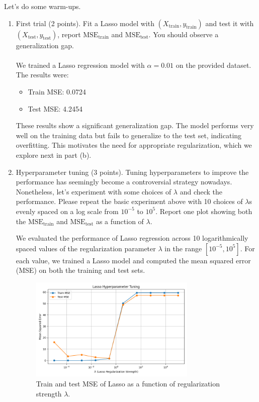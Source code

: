 \documentclass{article}
\begin{document}
Let's do some warm-ups.
\begin{enumerate}[label=(\alph*)]
\item First trial (2 points). Fit a Lasso model with $(X_{\text{train}}, y_{\text{train}})$ and test it with $(X_{\text{test}}, y_{\text{test}})$, report
$\text{MSE}_{\text{train}}$ and $\text{MSE}_{\text{test}}$. You should observe a generalization gap.\\\\We trained a Lasso regression model with \( \alpha = 0.01 \) on the provided dataset. The results were:

\begin{itemize}
    \item Train MSE: 0.0724
    \item Test MSE: 4.2454
\end{itemize}

These results show a significant generalization gap. The model performs very well on the training data but fails to generalize to the test set, indicating overfitting. This motivates the need for appropriate regularization, which we explore next in part (b).


\item Hyperparameter tuning (3 points). Tuning hyperparameters to improve the performance has seemingly
become a controversial strategy nowadays. Nonetheless, let's experiment with some choices of $\lambda$ and
check the performance. Please repeat the basic experiment above with 10 choices of $\lambda$s evenly spaced
on a log scale from $10^{-5}$ to $10^5$. Report one plot showing both the $\text{MSE}_{\text{train}}$ and $\text{MSE}_{\text{test}}$ as a function
of $\lambda$.

We evaluated the performance of Lasso regression across 10 logarithmically spaced values of the regularization parameter \( \lambda \) in the range \([10^{-5}, 10^5]\). For each value, we trained a Lasso model and computed the mean squared error (MSE) on both the training and test sets.

\begin{figure}[H]
    \centering
    \includegraphics[width=0.75\textwidth]{lasso_mse_vs_lambda.png}
    \caption{Train and test MSE of Lasso as a function of regularization strength \( \lambda \).}
\end{figure}


\end{enumerate}
\end{document}
